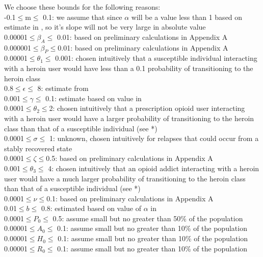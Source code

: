 \documentclass[12pt]{article}
\begin{document}
We choose these bounds for the following reasons: \\
-0.1$\leq$m$\leq$ 0.1: we assume that since $\alpha$ will be a value less than 1 based on estimate in \cite{Battista}, so it's slope will not be very large in absolute value \\
0.00001$\leq$$\beta_A$$\leq$ 0.01: based on preliminary calculations in Appendix A \\
0.000001$\leq$$\beta_P$$\leq$0.01: based on preliminary calculations in Appendix A \\
0.00001$\leq$$\theta_1$$\leq$ 0.001: chosen intuitively that a susceptible individual interacting with a heroin user would have less than a 0.1 probability of transitioning to the heroin class  \\
0.8$\leq$$\epsilon$$\leq$ 8: estimate from \cite{Battista} \\
0.001$\leq$$\gamma$$\leq$ 0.1: estimate based on value in \cite{Battista} \\
0.0001$\leq$$\theta_2$$\leq$2: chosen intuitively that a prescription opioid user interacting with a heroin user would have a larger probability of transitioning to the heroin class than that of a susceptible individual (see *) \cite{Muhuri}\\
0.0001$\leq$$\sigma$$\leq$ 1: unknown, chosen intuitively for relapses that could occur from a stably recovered state  \\
0.0001$\leq$$\zeta$$\leq$0.5: based on preliminary calculations in Appendix A\\
0.001$\leq$$\theta_3$$\leq$ 4: chosen intuitively that an opioid addict interacting with a heroin user would have a much larger probability of transitioning to the heroin class than that of a susceptible individual (see *) \cite{Muhuri}\\
0.0001$\leq$$\nu$$\leq$0.1: based on preliminary calculations in Appendix A \\
0.01$\leq$$b$$\leq$ 0.8: estimated based on value of $\alpha$ in \cite{Battista} \\
0.0001$\leq$$P_0$$\leq$ 0.5: assume small but no greater than 50\% of the population \\
0.00001$\leq$$A_0$$\leq$ 0.1: assume small but no greater than 10\% of the population \\
0.00001$\leq$$H_0$$\leq$ 0.1: assume small but no greater than 10\% of the population \\
0.00001$\leq$$R_0$$\leq$ 0.1: assume small but no greater than 10\% of the population \\
\end{document}
